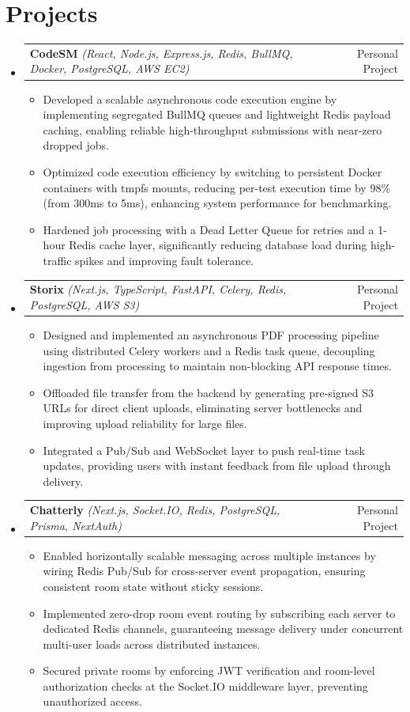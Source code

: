 \documentclass[letterpaper,10pt]{article}
\makeatletter
\newenvironment{resumeList}{
  \begin{itemize}[leftmargin=0.15in, label={}]
}{
  \end{itemize}
}
\newcommand{\resumeItem}[1]{
  \item\small{
    {#1 \vspace{-2.5pt}}
  }
}
\newcommand{\resumeProjectHeading}[3]{
  \vspace{-2pt}\item
    \begin{tabular*}{0.97\textwidth}[t]{l@{\extracolsep{\fill}}r}
      \textbf{#1} \textit{\small(#2)} & #3 \\
    \end{tabular*}\vspace{-6pt}
}
\newcommand{\resumeItemListStart}{\begin{itemize}[leftmargin=0.15in]}
\newcommand{\resumeItemListEnd}{\end{itemize}\vspace{-5pt}}
\makeatother
\begin{document}
\section{Projects}
\begin{resumeList}
    \resumeProjectHeading
    {CodeSM}{React, Node.js, Express.js, Redis, BullMQ, Docker, PostgreSQL, AWS EC2}{Personal Project}
  \resumeItemListStart
    \resumeItem{Developed a scalable asynchronous code execution engine by implementing segregated BullMQ queues and lightweight Redis payload caching, enabling reliable high-throughput submissions with near-zero dropped jobs.}
    \resumeItem{Optimized code execution efficiency by switching to persistent Docker containers with tmpfs mounts, reducing per-test execution time by 98\% (from 300ms to 5ms), enhancing system performance for benchmarking.}
    \resumeItem{Hardened job processing with a Dead Letter Queue for retries and a 1-hour Redis cache layer, significantly reducing database load during high-traffic spikes and improving fault tolerance.}
  \resumeItemListEnd

  \resumeProjectHeading
    {Storix}{Next.js, TypeScript, FastAPI, Celery, Redis, PostgreSQL, AWS S3}{Personal Project}
  \resumeItemListStart
    \resumeItem{Designed and implemented an asynchronous PDF processing pipeline using distributed Celery workers and a Redis task queue, decoupling ingestion from processing to maintain non-blocking API response times.}
    \resumeItem{Offloaded file transfer from the backend by generating pre-signed S3 URLs for direct client uploads, eliminating server bottlenecks and improving upload reliability for large files.}
    \resumeItem{Integrated a Pub/Sub and WebSocket layer to push real-time task updates, providing users with instant feedback from file upload through delivery.}
  \resumeItemListEnd

  \resumeProjectHeading
    {Chatterly}{Next.js, Socket.IO, Redis, PostgreSQL, Prisma, NextAuth}{Personal Project}
  \resumeItemListStart
    \resumeItem{Enabled horizontally scalable messaging across multiple instances by wiring Redis Pub/Sub for cross-server event propagation, ensuring consistent room state without sticky sessions.}
    \resumeItem{Implemented zero-drop room event routing by subscribing each server to dedicated Redis channels, guaranteeing message delivery under concurrent multi-user loads across distributed instances.}
    \resumeItem{Secured private rooms by enforcing JWT verification and room-level authorization checks at the Socket.IO middleware layer, preventing unauthorized access.}
  \resumeItemListEnd
\end{resumeList}
\end{document}

